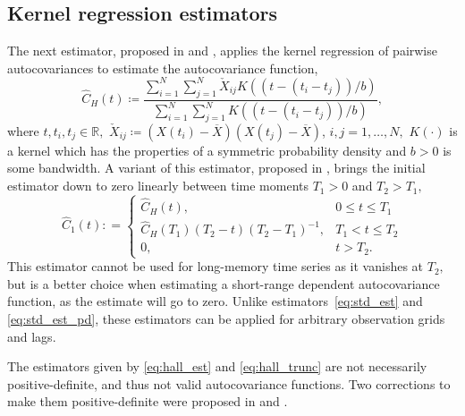 \subsection{Kernel regression
estimators}\label{kernel-regression-estimators}

The next estimator, proposed in \citet{hall1994} and \citet{hall1994_2},
applies the kernel regression of pairwise autocovariances to estimate
the autocovariance function, \begin{equation}
 \label{eq:hall_est}
\widehat{C}_{H}(t) \coloneq \frac{\displaystyle \sum_{i=1}^{N} \sum_{j=1}^{N}  \check{X}_{ij} K\left( \left(t - \left(t_{i} - t_{j}\right)\right) / b \right) }{\displaystyle \sum_{i=1}^{N} \sum_{j=1}^{N}  K\left( \left(t - \left(t_{i} - t_{j}\right)\right) / b \right) },
\end{equation} where \(t, t_{i}, t_{j} \in \mathbb{R},\)
\(\check{X}_{ij} \coloneq \left(X(t_{i}) - \overline{X}\right) \left(X(t_{j}) - \overline{X}\right)\),
\(i, j = 1, \dots, N,\) \(K(\cdot)\) is a kernel which has the
properties of a symmetric probability density and \(b > 0\) is some
bandwidth. A variant of this estimator, proposed in \cite{hall1994_2},
brings the initial estimator down to zero linearly between time moments
\(T_{1} > 0\) and \(T_{2} > T_{1},\) \begin{equation}
 \label{eq:hall_trunc}
    \widehat{C}_{1}(t): =
    \begin{cases}
        \widehat{C}_{H}(t), & 0 \leq t \leq T_{1} \\
        \widehat{C}_{H}\left(T_{1}\right) \left(T_{2} - t\right) \left(T_{2} - T_{1}\right)^{-1}, &  T_{1} < t \leq T_{2} \\
        0 , & t > T_{2} .
    \end{cases}
\end{equation} This estimator cannot be used for long-memory time series
as it vanishes at \(T_{2} ,\) but is a better choice when estimating a
short-range dependent autocovariance function, as the estimate will go
to zero. Unlike estimators~\eqref{eq:std_est} and \eqref{eq:std_est_pd},
these estimators can be applied for arbitrary observation grids and
lags.

The estimators given by \eqref{eq:hall_est} and \eqref{eq:hall_trunc}
are not necessarily positive-definite, and thus not valid autocovariance
functions. Two corrections to make them positive-definite were proposed
in \citet{hall1994} and \citet{hall1994_2}.

